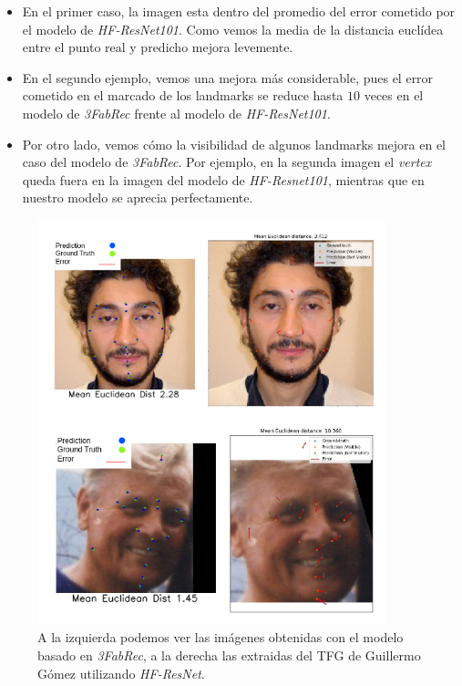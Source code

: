             \begin{itemize}
                \item En el primer caso, la imagen esta dentro del promedio del error cometido por el modelo de \textit{HF-ResNet101}. Como vemos la media de la distancia euclídea entre el punto real y predicho mejora levemente.
                \item En el segundo ejemplo, vemos una mejora más considerable, pues el error cometido en el marcado de los landmarks se reduce hasta $10$ veces en el modelo de \textit{3FabRec} frente al modelo de \textit{HF-ResNet101}. 
                \item Por otro lado, vemos cómo la visibilidad de algunos landmarks mejora en el caso del modelo de \textit{3FabRec}. Por ejemplo, en la segunda imagen el \textit{vertex} queda fuera en la imagen del modelo de \textit{HF-Resnet101}, mientras que en nuestro modelo se aprecia perfectamente.
            \end{itemize}

            \begin{figure}[h]
                \centering
                \includegraphics[width=0.9\textwidth]{img/compativa_cualitativa.png}
                \caption{A la izquierda podemos ver las imágenes obtenidas con el modelo basado en \textit{3FabRec}, a la derecha las extraidas del TFG de Guillermo Gómez utilizando \textit{HF-ResNet}.}
                \label{fig:comparativa_estado_arte}
            \end{figure}
            
